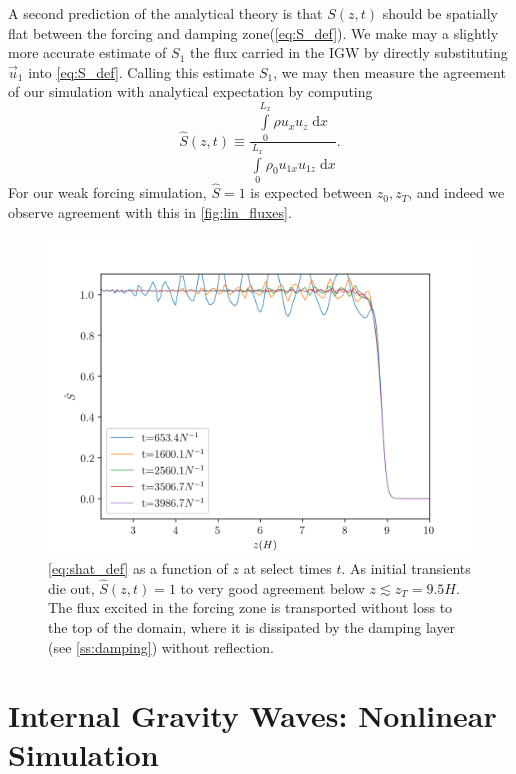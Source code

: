 \documentclass[
        fleqn,
        usenatbib,
    ]{mnras}
\begin{document}
A second prediction of the analytical theory is that $S(z, t)$ should be
spatially flat between the forcing and damping zone(\autoref{eq:S_def}). We make
may a slightly more accurate estimate of $S_1$ the flux carried in the IGW by
directly substituting $\vec{u}_1$ into \autoref{eq:S_def}. Calling this estimate
$S_1$, we may then measure the agreement of our simulation with analytical
expectation by computing
\begin{equation}
    \hat{S}(z, t) \equiv \frac{\int\limits_0^{L_x}\rho u_xu_z\;\mathrm{d}x}{
        \int\limits_{0}^{L_x} \rho_0 u_{1x}u_{1z}\;\mathrm{d}x}.
        \label{eq:shat_def}
\end{equation}
For our weak forcing simulation, $\hat{S} = 1$ is expected between $z_0, z_T$,
and indeed we observe agreement with this in \autoref{fig:lin_fluxes}.
\begin{figure}[t]
    \centering
    \includegraphics[width=\columnwidth]{plots/lin_fluxes.png}
    \caption{\autoref{eq:shat_def} as a function of $z$ at select times $t$. As
    initial transients die out, $\hat{S}(z, t) = 1$ to very good agreement below
    $z \lesssim z_T = 9.5H$. The flux excited in the forcing zone is transported
    without loss to the top of the domain, where it is dissipated by the damping
    layer (see \autoref{ss:damping}) without reflection.}\label{fig:lin_fluxes}
\end{figure}

\section{Internal Gravity Waves: Nonlinear Simulation}\label{s:sim}
\end{document}
